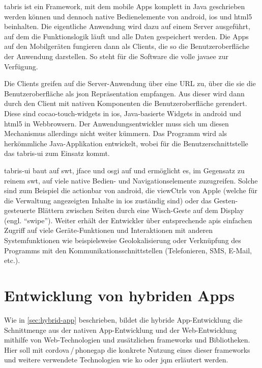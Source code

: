 \gls{tabris} ist ein Framework, mit dem mobile Apps komplett in Java geschrieben werden können und dennoch native Bedienelemente von \gls{android}, \gls{ios} und \gls{html5} beinhalten.
Die eigentliche Anwendung wird dazu auf einem Server ausgeführt, auf dem die Funktionslogik läuft und alle Daten gespeichert werden. Die Apps auf den Mobilgeräten fungieren dann als Clients, die so die Benutzeroberfläche der Anwendung darstellen.
So steht für die Software die volle \gls{javaee} zur Verfügung.

Die Clients greifen auf die Server-Anwendung über eine URL zu, über die sie die Benutzeroberfläche als \gls{json} Repräsentation empfangen. Aus dieser wird dann durch den Client mit nativen Komponenten die Benutzeroberfläche gerendert. Diese sind \gls{cocao-touch-widgets} in \gls{ios}, Java-basierte Widgets in \gls{android} und \gls{html}5 in Webbrowsern.
Der Anwendungsentwickler muss sich um diesen Mechanismus allerdings nicht weiter kümmern. Das Programm wird als herkömmliche Java-Applikation entwickelt, wobei für die Benutzerschnittstelle das \gls{tabris-ui} zum Einsatz kommt.

\gls{tabris-ui} baut auf \gls{swt}, \gls{jface} und \gls{osgi} auf und ermöglicht es, im Gegensatz zu reinem \gls{swt}, auf viele native Bedien- und Navigationselemente zuzugreifen. Solche sind zum Beispiel die \gls{actionbar} von \gls{android}, die \glspl{viewCtrl} von Apple (welche für die Verwaltung angezeigten Inhalte in \gls{ios} zuständig sind) oder das Gesten-gesteuerte Blättern zwischen Seiten durch eine Wisch-Geste auf dem Display (engl. \enquote{swipe}). Weiter erhält der Entwickler über entsprechende \glspl{api} einfachen Zugriff auf viele Geräte-Funktionen und Interaktionen mit anderen Systemfunktionen wie beispielsweise Geolokalisierung oder Verknüpfung des Programms mit den Kommunikationsschnittstellen (Telefonieren, SMS, E-Mail, etc.).

\section{Entwicklung von hybriden Apps}	\label{sec:hybrid-dev}


Wie in \ref{sec:hybrid-app} beschrieben, bildet die hybride App-Entwicklung die Schnittmenge aus der nativen App-Entwicklung und der Web-Entwicklung mithilfe von Web-Technologien und zusätzlichen \glspl{framework} und Bibliotheken. 
Hier soll mit \gls{cordova}\,/\,\gls{phonegap} die konkrete Nutzung eines dieser \glspl{framework} und weitere verwendete Technologien wie \gls{ko} oder \gls{jqm} erläutert werden.

